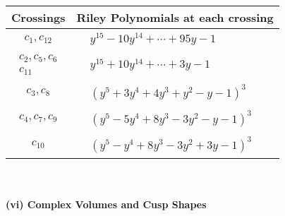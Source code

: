 \documentclass[1p]{elsarticle_modified}
\theoremstyle{definition}
\begin{document}
\begin{tabular}{m{50pt}|m{274pt}}
Crossings & \hspace{64pt}Riley Polynomials at each crossing \\
\hline $$\begin{aligned}c_{1},c_{12}\end{aligned}$$&$\begin{aligned}
&y^{15}-10 y^{14}+\cdots+95 y-1
\end{aligned}$\\
\hline $$\begin{aligned}c_{2},c_{5},c_{6}\\c_{11}\end{aligned}$$&$\begin{aligned}
&y^{15}+10 y^{14}+\cdots+3 y-1
\end{aligned}$\\
\hline $$\begin{aligned}c_{3},c_{8}\end{aligned}$$&$\begin{aligned}
&(y^5+3 y^4+4 y^3+y^2- y-1)^3
\end{aligned}$\\
\hline $$\begin{aligned}c_{4},c_{7},c_{9}\end{aligned}$$&$\begin{aligned}
&(y^5-5 y^4+8 y^3-3 y^2- y-1)^3
\end{aligned}$\\
\hline $$\begin{aligned}c_{10}\end{aligned}$$&$\begin{aligned}
&(y^5- y^4+8 y^3-3 y^2+3 y-1)^3
\end{aligned}$\\
\hline
\end{tabular}\\~\\
\newpage\flushleft \textbf{(vi) Complex Volumes and Cusp Shapes}
\end{document}
